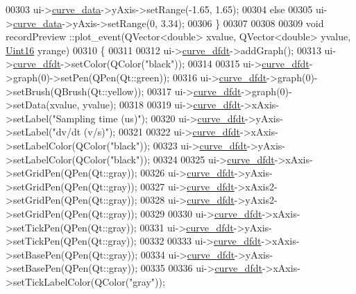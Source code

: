\begin{DoxyCode}
00303   ui->\hyperlink{a00081_a247d94481323c0bc4f8b6458a8a535dd}{curve\_data}->yAxis->setRange(-1.65, 1.65);
00304   \textcolor{keywordflow}{else}
00305   ui->\hyperlink{a00081_a247d94481323c0bc4f8b6458a8a535dd}{curve\_data}->yAxis->setRange(0, 3.34);
00306 \}
00307 
00308 
00309 \textcolor{keywordtype}{void} recordPreview ::plot\_event(QVector<double> xvalue, QVector<double> yvalue, 
      \hyperlink{a00004_aae7407b021d43f7193a81a58cfb3e297}{Uint16} yrange)
00310 \{
00311 
00312   ui->\hyperlink{a00081_a43d24fa14d90cc27b310542e39dcdd1b}{curve\_dfdt}->addGraph();
00313   ui->\hyperlink{a00081_a43d24fa14d90cc27b310542e39dcdd1b}{curve\_dfdt}->setColor(QColor(\textcolor{stringliteral}{"black"}));
00314 
00315   ui->\hyperlink{a00081_a43d24fa14d90cc27b310542e39dcdd1b}{curve\_dfdt}->graph(0)->setPen(QPen(Qt::green));
00316   ui->\hyperlink{a00081_a43d24fa14d90cc27b310542e39dcdd1b}{curve\_dfdt}->graph(0)->setBrush(QBrush(Qt::yellow));
00317   ui->\hyperlink{a00081_a43d24fa14d90cc27b310542e39dcdd1b}{curve\_dfdt}->graph(0)->setData(xvalue, yvalue);
00318 
00319   ui->\hyperlink{a00081_a43d24fa14d90cc27b310542e39dcdd1b}{curve\_dfdt}->xAxis->setLabel(\textcolor{stringliteral}{"Sampling time (us)"});
00320   ui->\hyperlink{a00081_a43d24fa14d90cc27b310542e39dcdd1b}{curve\_dfdt}->yAxis->setLabel(\textcolor{stringliteral}{"dv/dt         (v/s)"});
00321 
00322   ui->\hyperlink{a00081_a43d24fa14d90cc27b310542e39dcdd1b}{curve\_dfdt}->xAxis->setLabelColor(QColor(\textcolor{stringliteral}{"black"}));
00323   ui->\hyperlink{a00081_a43d24fa14d90cc27b310542e39dcdd1b}{curve\_dfdt}->yAxis->setLabelColor(QColor(\textcolor{stringliteral}{"black"}));
00324 
00325   ui->\hyperlink{a00081_a43d24fa14d90cc27b310542e39dcdd1b}{curve\_dfdt}->xAxis->setGridPen(QPen(Qt::gray));
00326   ui->\hyperlink{a00081_a43d24fa14d90cc27b310542e39dcdd1b}{curve\_dfdt}->yAxis->setGridPen(QPen(Qt::gray));
00327   ui->\hyperlink{a00081_a43d24fa14d90cc27b310542e39dcdd1b}{curve\_dfdt}->xAxis2->setGridPen(QPen(Qt::gray));
00328   ui->\hyperlink{a00081_a43d24fa14d90cc27b310542e39dcdd1b}{curve\_dfdt}->yAxis2->setGridPen(QPen(Qt::gray));
00329 
00330   ui->\hyperlink{a00081_a43d24fa14d90cc27b310542e39dcdd1b}{curve\_dfdt}->xAxis->setTickPen(QPen(Qt::gray));
00331   ui->\hyperlink{a00081_a43d24fa14d90cc27b310542e39dcdd1b}{curve\_dfdt}->yAxis->setTickPen(QPen(Qt::gray));
00332 
00333   ui->\hyperlink{a00081_a43d24fa14d90cc27b310542e39dcdd1b}{curve\_dfdt}->xAxis->setBasePen(QPen(Qt::gray));
00334   ui->\hyperlink{a00081_a43d24fa14d90cc27b310542e39dcdd1b}{curve\_dfdt}->yAxis->setBasePen(QPen(Qt::gray));
00335 
00336   ui->\hyperlink{a00081_a43d24fa14d90cc27b310542e39dcdd1b}{curve\_dfdt}->xAxis->setTickLabelColor(QColor(\textcolor{stringliteral}{"gray"}));

\end{DoxyCode}
